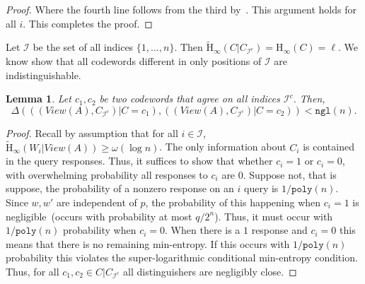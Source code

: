 \documentclass[11pt]{article}
\newcommand{\poly}{\ensuremath{\mathtt{poly}}\xspace}
\newcommand{\ngl}{\ensuremath{\mathtt{ngl}}\xspace}
\newcommand{\Hoo}{\mathrm{H}_\infty}
\newcommand{\Hav}{\tilde{\mathrm{H}}_\infty}
\newtheorem{lemma}[theorem]{Lemma}
\newcommand{\authnote}[2]{{\textcolor{red}{\textsf{#1 notes: }\textcolor{blue}{ #2}}\marginpar{\textcolor{red}{\textbf{!!!!!}}}}}
\newcommand{\authnote}[2]{}
\newcommand{\bnote}[1]{{\authnote{Ben}{#1}}}
\begin{document}
\begin{proof}
Where the fourth line follows from the third by~\cite[Lemma 2.2]{DBLP:journals/siamcomp/DodisORS08}.
This argument holds for all $i$.  This completes the proof.
\end{proof}
Let $\mathcal{I}$ be the set of all indices $\{1,..., n\}$.  Then $\Hav(C | C_{\mathcal{I}^c}) = \Hoo(C) = \ell$.  We know show that all codewords different in only positions of $\mathcal{I}$ are indistinguishable.
\begin{lemma}
\label{lem:codewords in I close}
Let $c_1, c_2$ be two codewords that agree on all indices $\mathcal{I}^c$.  Then, 
\[
\Delta( ((View(A), C_{\mathcal{I}^c} )| C = c_1),( (View(A), C_{\mathcal{I}^c})  | C= c_2)) < \ngl(n).
\]
\end{lemma}
\begin{proof}
Recall by assumption that for all $i\in \mathcal{I}$, $\Hav(W_i | View(A))\geq \omega(\log n)$.  The only information about $C_i$ is contained in the query responses.  Thus, it suffices to show that whether $c_i= 1$ or $c_i=0$, with overwhelming probability all responses to $c_i$ are $0$.  Suppose not, that is suppose, the probability of a nonzero response on an $i$ query is $1/\poly(n)$.  Since $w, w'$ are independent of $p$, the probability of this happening when $c_i = 1$ is negligible~(occurs with probability at most $q/2^n$).  Thus, it must occur with $1/\poly(n)$ probability when $c_i=0$.  When there is a $1$ response and $c_i=0$ this means that there is no remaining min-entropy.  If this occurs with $1/\poly(n)$ probability this violates the super-logarithmic conditional min-entropy condition.  Thus, for all $c_1, c_2\in C| C_{\mathcal{I}^c}$ all distinguishers are negligibly close.
\end{proof}
\end{document}
